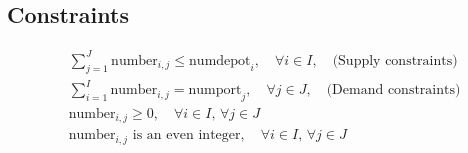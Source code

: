\documentclass{article}
\begin{document}
\subsection*{Constraints}
\begin{align*}
    & \sum_{j=1}^{J} \text{number}_{i,j} \leq \text{numdepot}_i, \quad \forall i \in I, \quad \text{(Supply constraints)} \\
    & \sum_{i=1}^{I} \text{number}_{i,j} = \text{numport}_j, \quad \forall j \in J, \quad \text{(Demand constraints)} \\
    & \text{number}_{i,j} \geq 0, \quad \forall i \in I, \, \forall j \in J \\
    & \text{number}_{i,j} \text{ is an even integer}, \quad \forall i \in I, \, \forall j \in J
\end{align*}
\end{document}
